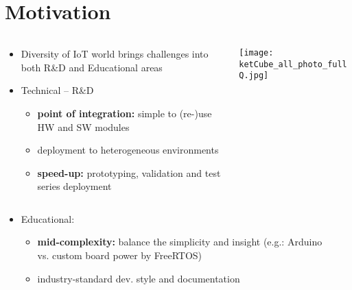 



\section{Motivation}

\begin{frame}%
    \begin{columns}
      \begin{column}{0.6\paperwidth}
         
         \begin{itemize}
           \item Diversity of IoT world brings challenges into both R\&D and Educational areas
           \item Technical -- R\&D
           \begin{itemize}
             \item {\bf point of integration:} simple to (re-)use HW and SW modules
             \item deployment to heterogeneous environments
             \item {\bf speed-up:} prototyping, validation and test series deployment
           \end{itemize}
         \end{itemize}
      \end{column}
      \begin{column}{0.4\paperwidth}
         \centering
         \texttt{[image: ketCube\_all\_photo\_fullQ.jpg]}
         \vfill
       \end{column}
    \end{columns}
  
  \flushleft
  \begin{columns}
      \begin{column}{0.95\paperwidth}
        \begin{itemize}
          \item Educational:
           \begin{itemize}
             \item {\bf mid-complexity:} balance the simplicity and insight (e.g.: Arduino vs. custom board power by FreeRTOS)
             \item industry-standard dev. style and documentation
           \end{itemize}
          \end{itemize}
        \end{column}
      \begin{column}{0.05\paperwidth}
         \centering
         ~
       \end{column}
    \end{columns}
  
\end{frame}

